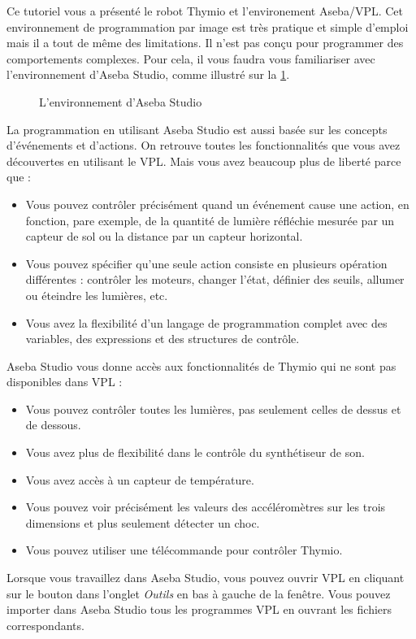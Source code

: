
Ce tutoriel vous a présenté le robot Thymio et l'environement Aseba/VPL.
Cet environnement de programmation par image est très pratique et simple d'emploi mais il a tout de même des limitations.
Il n'est pas conçu pour programmer des comportements complexes.
Pour cela, il vous faudra vous familiariser avec l'environnement d'Aseba Studio, comme illustré sur la \cref{fig.studio}.

\begin{figure}[hbt]
\begin{center}
\caption{L'environnement d'Aseba Studio}\label{fig.studio}
\end{center}
\end{figure}

La programmation en utilisant Aseba Studio est aussi basée sur les concepts d'événements et d'actions.
On retrouve toutes les fonctionnalités que vous avez découvertes en utilisant le VPL.
Mais vous avez beaucoup plus de liberté parce que :
\begin{itemize}
\item Vous pouvez contrôler précisément quand un événement cause une action, en fonction, pare exemple, de la quantité de lumière réfléchie mesurée par un capteur de sol ou la distance par un capteur horizontal.
\item Vous pouvez spécifier qu'une seule action consiste en plusieurs opération différentes : contrôler les moteurs, changer l'état, définier des seuils, allumer ou éteindre les lumières, etc.
\item Vous avez la flexibilité d'un langage de programmation complet avec des variables, des expressions et des structures de contrôle.
\end{itemize}

Aseba Studio vous donne accès aux fonctionnalités de Thymio qui ne sont pas disponibles dans VPL :
\begin{itemize}
\item Vous pouvez contrôler toutes les lumières, pas seulement celles de dessus et de dessous.
\item Vous avez plus de flexibilité dans le contrôle du synthétiseur de son.
\item Vous avez accès à un capteur de température.
\item Vous pouvez voir précisément les valeurs des accéléromètres sur les trois dimensions et plus seulement détecter un choc.
\item Vous pouvez utiliser une télécommande pour contrôler Thymio.
\end{itemize}
Lorsque vous travaillez dans Aseba Studio, vous pouvez ouvrir VPL en cliquant sur le bouton  dans l'onglet \emph{Outils} en bas à gauche de la fenêtre.
Vous pouvez importer dans Aseba Studio tous les programmes VPL en ouvrant les fichiers correspondants.

